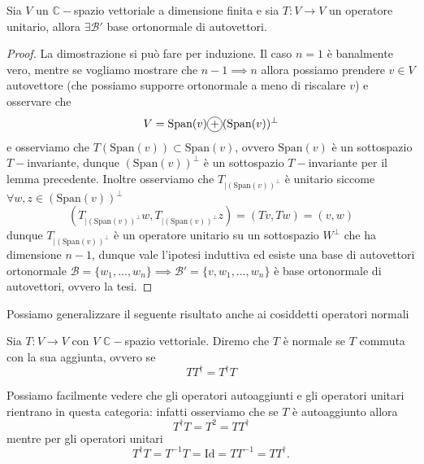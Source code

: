 \documentclass[12pt, twoside, italian, openany]{book}
\begin{document}
	\begin{theorem}
		Sia $V$ un $\mathbb{C}-$spazio vettoriale a dimensione finita e sia $T: V \to V$ un operatore unitario, allora $\exists \mathcal{B}'$ base ortonormale di autovettori.
	\end{theorem}
	\begin{proof}
		La dimostrazione si può fare per induzione. Il caso $n=1$ è banalmente vero, mentre se vogliamo mostrare che $n-1 \implies n$ allora possiamo prendere $v \in V$ autovettore (che possiamo supporre ortonormale a meno di riscalare $v$) e osservare che
		$$
		V = \text{Span}(v) \circled{+} (\text{Span}(v))^\perp
		$$
		e osserviamo che $T(\text{Span}(v)) \subset \text{Span}(v)$, ovvero $\text{Span}(v)$ è un sottospazio $T-$invariante, dunque $(\text{Span}(v))^{\perp}$ è un sottospazio $T-$invariante per il lemma precedente. Inoltre osserviamo che $T_{|(\text{Span}(v))^{\perp}}$ è unitario siccome $\forall w, z \in (\text{Span}(v))^{\perp}$
		$$
			(T_{|(\text{Span}(v))^{\perp}} w, T_{|(\text{Span}(v))^\perp} z) = (Tv, Tw) = (v, w) 
		$$
		dunque $T_{|(\text{Span}(v))^{\perp}}$ è un operatore unitario su un sottospazio $W^\perp$ che ha dimensione $n-1$, dunque vale l'ipotesi induttiva ed esiste una base di autovettori ortonormale $\mathcal{B}=\{w_1, \ldots, w_n \} \implies \mathcal{B}' = \{ v, w_1, \ldots, w_n \}$ è base ortonormale di autovettori, ovvero la tesi.
	\end{proof}
	Possiamo generalizzare il seguente risultato anche ai cosiddetti operatori normali
	\begin{definition}
		Sia $T: V \to V$ con $V$ $\mathbb{C}-$spazio vettoriale. Diremo che $T$ è normale se $T$ commuta con la sua aggiunta, ovvero se
		$$
			TT^{\dag} = T^{\dag} T
		$$
	\end{definition}
	Possiamo facilmente vedere che gli operatori autoaggiunti e gli operatori unitari rientrano in questa categoria: infatti osserviamo che se $T$ è autoaggiunto allora
	$$
	T^{\dag} T = T^2 = T T^\dag
	$$
	mentre per gli operatori unitari
	$$
		T^{\dag} T = T^{-1} T = \text{Id} = T T^{-1} = T T^{\dag}.
	$$
	\begin{figure}[H]
		\centering
	\end{figure}
\end{document}
